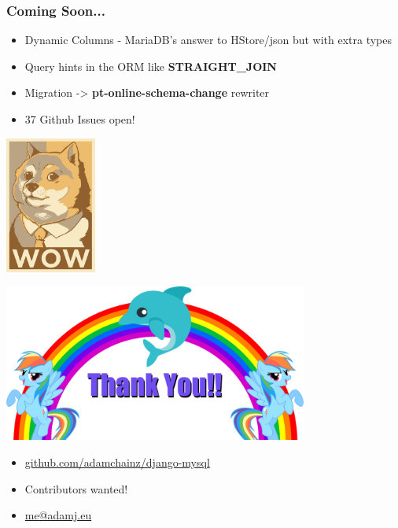 \documentclass{beamer}
\begin{document}
\begin{frame}[fragile]\frametitle{Coming Soon...}

    \begin{itemize}
        \item Dynamic Columns - MariaDB's answer to HStore/json but with extra
              types
        \item Query hints in the ORM like \textbf{STRAIGHT\_JOIN}
        \item Migration -> \textbf{pt-online-schema-change} rewriter
        \item 37 Github Issues open!
    \end{itemize}

    \begin{center}
        \includegraphics[width=3cm]{wow-doge}
    \end{center}

\end{frame}


\begin{frame}[fragile]

    \begin{center}
        \includegraphics[width=10cm]{thank-you}
    \end{center}

    \begin{itemize}
        \item \url{github.com/adamchainz/django-mysql}
        \item Contributors wanted!
        \item \url{me@adamj.eu}
    \end{itemize}

\end{frame}
\end{document}

